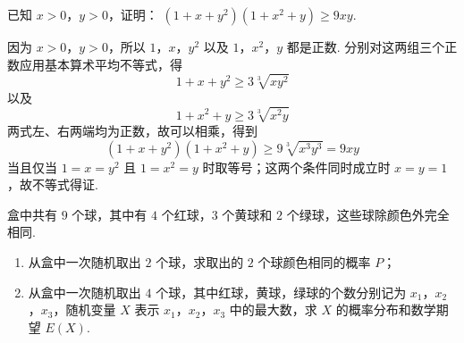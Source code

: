 \reuseproblemnumber
\begin{problem}[D]
已知 \(x > 0\)，\(y > 0\)，证明： \((1 + x + y^2)(1 + x^2 + y) \geqslant 9xy\).
\end{problem}

\begin{solution}
因为 \(x>0\)，\(y>0\)，所以 \(1\)，\(x\)，\(y^2\) 以及 \(1\)，\(x^2\)，\(y\) 都是正数. 分别对这两组三个正数应用基本算术平均不等式，得
\[
1+x+y^2\geqslant3\sqrt[3]{xy^2}
\]
以及
\[
1+x^2+y\geqslant3\sqrt[3]{x^2y}
\]
两式左、右两端均为正数，故可以相乘，得到
\[
(1+x+y^2)(1+x^2+y)\geqslant9\sqrt[3]{x^3y^3}=9xy
\]
当且仅当 \(1=x=y^2\) 且 \(1=x^2=y\) 时取等号；这两个条件同时成立时 \(x=y=1\)，故不等式得证.
\end{solution}

\begin{problem}
盒中共有 \(9\) 个球，其中有 \(4\) 个红球，\(3\) 个黄球和 \(2\) 个绿球，这些球除颜色外完全相同.
\begin{enumerate}
\item 从盒中一次随机取出 \(2\) 个球，求取出的 \(2\) 个球颜色相同的概率 \(P\)；
\item 从盒中一次随机取出 \(4\) 个球，其中红球，黄球，绿球的个数分别记为 \(x_1\)，\(x_2\)，\(x_3\)，随机变量 \(X\) 表示 \(x_1\)，\(x_2\)，\(x_3\) 中的最大数，求 \(X\) 的概率分布和数学期望 \(E(X)\).
\end{enumerate}
\end{problem}

